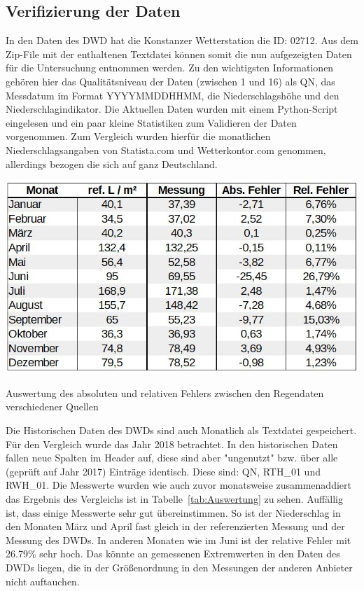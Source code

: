 \subsection{Verifizierung der Daten}
In den Daten des DWD hat die Konstanzer Wetterstation die ID: 02712. Aus dem Zip-File mit der enthaltenen Textdatei können somit die nun aufgezeigten Daten für die Untersuchung entnommen werden. Zu den wichtigsten Informationen gehören hier das Qualitätsniveau der Daten (zwischen 1 und 16) als QN, das Messdatum im Format YYYYMMDDHHMM, die Niederschlagshöhe und den Niederschlagindikator. Die Aktuellen Daten wurden mit einem Python-Script eingelesen und ein paar kleine Statistiken zum Validieren der Daten vorgenommen. Zum Vergleich wurden hierfür die monatlichen Niederschlagsangaben von Statista.com und Wetterkontor.com genommen, allerdings bezogen die sich auf ganz Deutschland. 
\begin{table}[ht]
\centering
\includegraphics[width=\linewidth]{pics/Auswertung_Thomas}
\caption{Auswertung des absoluten und relativen Fehlers zwischen den Regendaten verschiedener Quellen}
\label{tab:Auswertung}
\end{table}
Die Historischen Daten des DWDs sind auch Monatlich als Textdatei gespeichert. Für den Vergleich wurde das Jahr 2018 betrachtet. In den historischen Daten fallen neue Spalten im Header auf, diese sind aber "ungenutzt" bzw. über alle (geprüft auf Jahr 2017) Einträge identisch. Diese sind: QN, RTH\_01 und RWH\_01. Die Messwerte wurden wie auch zuvor monatsweise zusammenaddiert das Ergebnis des Vergleichs ist in Tabelle~\ref{tab:Auswertung} zu sehen. 
Auffällig ist, dass einige Messwerte sehr gut übereinstimmen. So ist der Niederschlag in den Monaten März und April fast gleich in der referenzierten Messung und der Messung des DWDs. In anderen Monaten wie im Juni ist der relative Fehler mit 26.79\% sehr hoch. Das könnte an gemessenen Extremwerten in den Daten des DWDs liegen, die in der Größenordnung in den Messungen der anderen Anbieter nicht auftauchen.  


